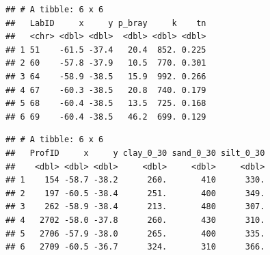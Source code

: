 \documentclass[
  10pt,
  b5paper,
  oneside]{book}
\newenvironment{Shaded}{\begin{snugshade}}{\end{snugshade}}
\newcommand{\CommentTok}[1]{\textcolor[rgb]{0.56,0.35,0.01}{\textit{#1}}}
\newcommand{\DecValTok}[1]{\textcolor[rgb]{0.00,0.00,0.81}{#1}}
\newcommand{\FloatTok}[1]{\textcolor[rgb]{0.00,0.00,0.81}{#1}}
\newcommand{\FunctionTok}[1]{\textcolor[rgb]{0.00,0.00,0.00}{#1}}
\newcommand{\NormalTok}[1]{#1}
\newcommand{\OtherTok}[1]{\textcolor[rgb]{0.56,0.35,0.01}{#1}}
\newcommand{\SpecialCharTok}[1]{\textcolor[rgb]{0.00,0.00,0.00}{#1}}
\begin{document}
\begin{Shaded}
\end{Shaded}

\begin{verbatim}
## # A tibble: 6 x 6
##   LabID     x     y p_bray     k    tn
##   <chr> <dbl> <dbl>  <dbl> <dbl> <dbl>
## 1 51    -61.5 -37.4   20.4  852. 0.225
## 2 60    -57.8 -37.9   10.5  770. 0.301
## 3 64    -58.9 -38.5   15.9  992. 0.266
## 4 67    -60.3 -38.5   20.8  740. 0.179
## 5 68    -60.4 -38.5   13.5  725. 0.168
## 6 69    -60.4 -38.5   46.2  699. 0.129
\end{verbatim}

\begin{Shaded}
\end{Shaded}

\begin{verbatim}
## # A tibble: 6 x 6
##   ProfID     x     y clay_0_30 sand_0_30 silt_0_30
##    <dbl> <dbl> <dbl>     <dbl>     <dbl>     <dbl>
## 1    154 -58.7 -38.2      260.       410      330.
## 2    197 -60.5 -38.4      251.       400      349.
## 3    262 -58.9 -38.4      213.       480      307.
## 4   2702 -58.0 -37.8      260.       430      310.
## 5   2706 -57.9 -38.0      265.       400      335.
## 6   2709 -60.5 -36.7      324.       310      366.
\end{verbatim}

\begin{Shaded}
\end{Shaded}
\end{document}
